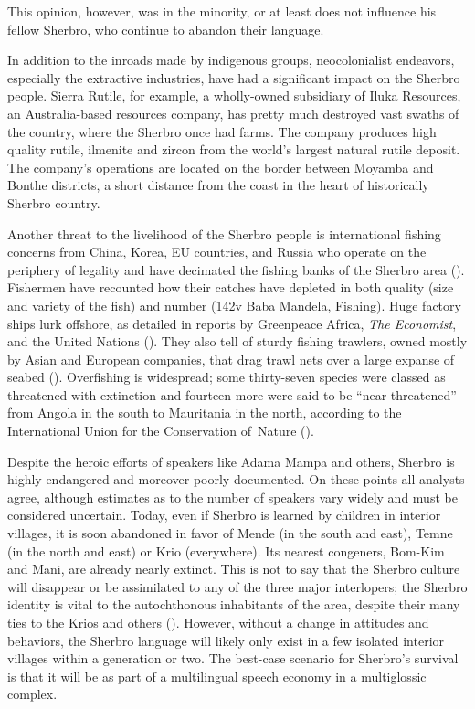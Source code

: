 This opinion, however, was in the minority, or at least does not influence his fellow Sherbro, who continue to abandon their language.

In addition to the inroads made by indigenous groups, neocolonialist endeavors, especially the extractive industries, have had a significant impact on the Sherbro people. Sierra Rutile, for example, a wholly-owned subsidiary of Iluka Resources, an Australia-based resources company, has pretty much destroyed vast swaths of the country, where the Sherbro once had farms. The company produces high quality rutile, ilmenite and zircon from the world's largest natural rutile deposit. The company's operations are located on the border between Moyamba and Bonthe districts, a short distance from the coast in the heart of historically Sherbro country.

Another threat to the livelihood of the Sherbro people is international fishing concerns from China, Korea, EU countries, and Russia who operate on the periphery of legality and have decimated the fishing banks of the Sherbro area (\citealt{Economist2017}). Fishermen have recounted how their catches have depleted in both quality (size and variety of the fish) and number (142v Baba Mandela, Fishing). Huge factory ships lurk offshore, as detailed in reports by Greenpeace Africa, \textit{The Economist}, and the United Nations (\citealt{Joaque2017}). They also tell of sturdy fishing trawlers, owned mostly by Asian and European companies, that drag trawl nets over a large expanse of seabed (\citealt{Ighobor1917}). Overfishing is widespread; some thirty-seven species were classed as threatened with extinction and fourteen more were said to be “near threatened” from Angola in the south to Mauritania in the north, according to the International Union for the Conservation of~Nature (\citealt{Ighobor1917}).

Despite the heroic efforts of speakers like Adama Mampa and others, Sherbro is highly endangered and moreover poorly documented. On these points all analysts agree, although estimates as to the number of speakers vary widely and must be considered uncertain. Today, even if Sherbro is learned by children in interior villages, it is soon abandoned in favor of Mende (in the south and east), Temne (in the north and east) or Krio (everywhere). Its nearest congeners, Bom-Kim and Mani, are already nearly extinct. This is not to say that the Sherbro culture will disappear or be assimilated to any of the three major interlopers; the Sherbro identity is vital to the autochthonous inhabitants of the area, despite their many ties to the Krios and others (\citealt{Ménard2015}). However, without a change in attitudes and behaviors, the Sherbro language will likely only exist in a few isolated interior villages within a generation or two. The best-case scenario for Sherbro's survival is that it will be as part of a multilingual speech economy in a multiglossic complex.

